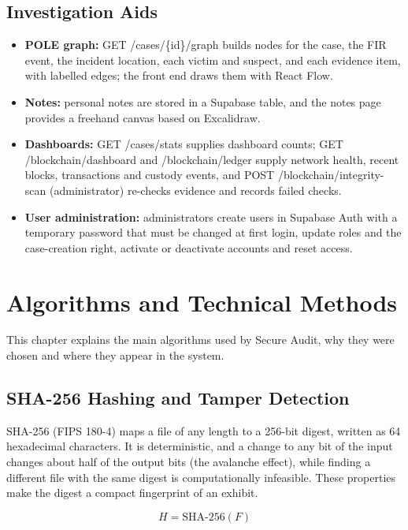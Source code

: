 \documentclass[12pt,a4paper,oneside]{report}
\newcommand{\code}[1]{{\small\ttfamily #1}}
\begin{document}
\section{Investigation Aids}
\begin{itemize}
  \item \textbf{POLE graph:} \code{GET /\allowbreak{}cases/\allowbreak{}\{id\}/\allowbreak{}graph} builds nodes for the case, the FIR event, the incident location, each victim and suspect, and each evidence item, with labelled edges; the front end draws them with React Flow.
  \item \textbf{Notes:} personal notes are stored in a Supabase table, and the notes page provides a freehand canvas based on Excalidraw.
  \item \textbf{Dashboards:} \code{GET /\allowbreak{}cases/\allowbreak{}stats} supplies dashboard counts; \code{GET /\allowbreak{}blockchain/\allowbreak{}dashboard} and \code{/\allowbreak{}blockchain/\allowbreak{}ledger} supply network health, recent blocks, transactions and custody events, and \code{POST /\allowbreak{}blockchain/\allowbreak{}integrity-scan} (administrator) re-checks evidence and records failed checks.
  \item \textbf{User administration:} administrators create users in Supabase Auth with a temporary password that must be changed at first login, update roles and the case-creation right, activate or deactivate accounts and reset access.
\end{itemize}

\chapter{Algorithms and Technical Methods}
This chapter explains the main algorithms used by Secure Audit, why they were chosen and where they appear in the system.

\section{SHA-256 Hashing and Tamper Detection}
SHA-256 (FIPS 180-4) maps a file of any length to a 256-bit digest, written as 64 hexadecimal characters. It is deterministic, and a change to any bit of the input changes about half of the output bits (the avalanche effect), while finding a different file with the same digest is computationally infeasible. These properties make the digest a compact fingerprint of an exhibit.

\begin{equation*}
H = \mathrm{SHA\text{-}256}(F)
\end{equation*}
\end{document}
